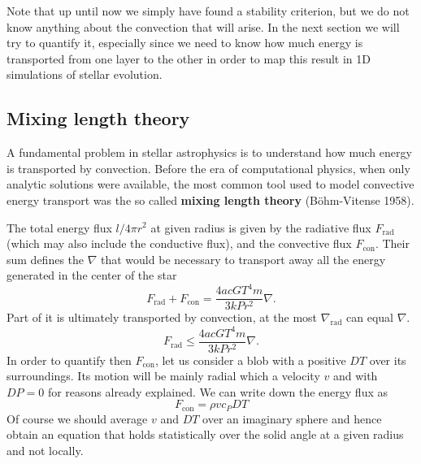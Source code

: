 Note that up until now we simply have found a stability criterion, but we do not know anything about the convection that will arise. In the next section we will try to quantify it, especially since we need to know how much energy is transported from one layer to the other in order to map this result in 1D simulations of stellar evolution.

\subsection{Mixing length theory}
A fundamental problem in stellar astrophysics is to understand how much energy is transported by convection. Before the era of computational physics, when only analytic solutions were available, the most common tool used to model convective energy transport was the so called \textbf{mixing length theory} (Böhm-Vitense 1958). 

The total energy flux $l/4 \pi r^2$ at given radius is given by the radiative flux $F_{\mathrm{rad}}$ (which may also include the conductive flux), and the convective flux $F_{\mathrm{con}}$. Their sum defines the $\nabla$ that would be necessary to transport away all the energy generated in the center of the star
\begin{equation}\label{7.1}
F_{\mathrm{rad}}+ F_{\mathrm{con}}= \frac{4 a c G T^4 m }{3 k P r^2} \nabla.
\end{equation}
Part of it is ultimately transported by convection, at the most $\nabla_{\mathrm{rad}}$ can equal $\nabla$.
\begin{equation}\label{7.2}
F_{\mathrm{rad}} \leq \frac{4 a c G T^4 m}{3 k P r^2} \nabla.
\end{equation}
In order to quantify then $F_{\mathrm{con}}$, let us consider a blob with a positive $DT$ over its surroundings. Its motion will be mainly radial which a velocity $v$ and with $DP=0$ for reasons already explained. We can write down the energy flux as
\begin{equation}\label{fconv}
	F_{\mathrm{con}}=\rho  v  c_P  DT
\end{equation}
Of course we should average $v$ and $DT$ over an imaginary sphere and hence obtain an equation that holds statistically over the solid angle at a given radius and not locally. 

